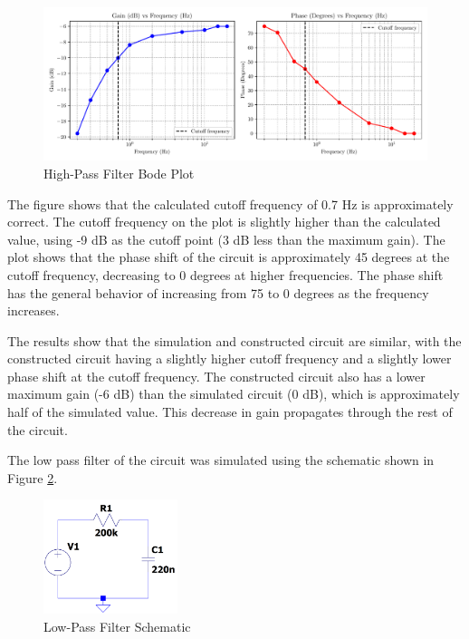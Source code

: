 \documentclass[CMPE]{KGCOEReport}
\begin{document}
\begin{figure}[H]
    \centering
    \includegraphics[width=1\textwidth]{high_pass_plot.pdf}
    \caption{High-Pass Filter Bode Plot}
    \label{fig:highPassBode}
\end{figure}

The figure shows that the calculated cutoff frequency of 0.7 Hz is approximately correct. The cutoff frequency on the plot is slightly higher than the calculated value, using -9 dB as the cutoff point (3 dB less than the maximum gain). The plot shows that the phase shift of the circuit is approximately 45 degrees at the cutoff frequency, decreasing to 0 degrees at higher frequencies. The phase shift has the general behavior of increasing from 75 to 0 degrees as the frequency increases.

The results show that the simulation and constructed circuit are similar, with the constructed circuit having a slightly higher cutoff frequency and a slightly lower phase shift at the cutoff frequency. The constructed circuit also has a lower maximum gain (-6 dB) than the simulated circuit (0 dB), which is approximately half of the simulated value. This decrease in gain propagates through the rest of the circuit.

\bigskip

The low pass filter of the circuit was simulated using the schematic shown in Figure \ref{fig:ltspiceLowPassSchematic}.

\begin{figure}[H]
    \centering
    \includegraphics[width=0.35\textwidth]{LowPass.png}
    \caption{Low-Pass Filter Schematic}
    \label{fig:ltspiceLowPassSchematic}
\end{figure}
\end{document}
